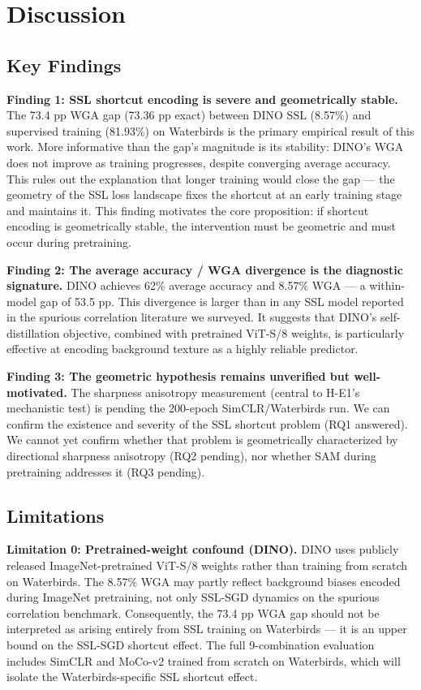 \section{Discussion}
\label{sec:discussion}

\subsection{Key Findings}

\textbf{Finding 1: SSL shortcut encoding is severe and geometrically stable.}
The 73.4 pp WGA gap (73.36 pp exact) between DINO SSL (8.57\%) and supervised training (81.93\%) on Waterbirds is the primary empirical result of this work. More informative than the gap's magnitude is its stability: DINO's WGA does not improve as training progresses, despite converging average accuracy. This rules out the explanation that longer training would close the gap --- the geometry of the SSL loss landscape fixes the shortcut at an early training stage and maintains it. This finding motivates the core proposition: if shortcut encoding is geometrically stable, the intervention must be geometric and must occur during pretraining.

\textbf{Finding 2: The average accuracy / WGA divergence is the diagnostic signature.}
DINO achieves 62\% average accuracy and 8.57\% WGA --- a within-model gap of 53.5 pp. This divergence is larger than in any SSL model reported in the spurious correlation literature we surveyed. It suggests that DINO's self-distillation objective, combined with pretrained ViT-S/8 weights, is particularly effective at encoding background texture as a highly reliable predictor.

\textbf{Finding 3: The geometric hypothesis remains unverified but well-motivated.}
The sharpness anisotropy measurement (central to H-E1's mechanistic test) is pending the 200-epoch SimCLR/Waterbirds run. We can confirm the existence and severity of the SSL shortcut problem (RQ1 answered). We cannot yet confirm whether that problem is geometrically characterized by directional sharpness anisotropy (RQ2 pending), nor whether SAM during pretraining addresses it (RQ3 pending).

\subsection{Limitations}

\textbf{Limitation 0: Pretrained-weight confound (DINO).}
DINO uses publicly released ImageNet-pretrained ViT-S/8 weights rather than training from scratch on Waterbirds. The 8.57\% WGA may partly reflect background biases encoded during ImageNet pretraining, not only SSL-SGD dynamics on the spurious correlation benchmark. Consequently, the 73.4 pp WGA gap should not be interpreted as arising entirely from SSL training on Waterbirds --- it is an upper bound on the SSL-SGD shortcut effect. The full 9-combination evaluation includes SimCLR and MoCo-v2 trained from scratch on Waterbirds, which will isolate the Waterbirds-specific SSL shortcut effect.

